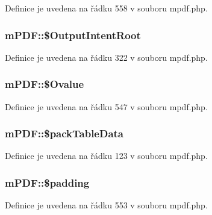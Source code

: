 Definice je uvedena na řádku 558 v souboru mpdf.\-php.

\hypertarget{classm_p_d_f_aa107caae1812606296893657965b6307}{
\subsubsection[{\$\-Output\-Intent\-Root}]{\setlength{\rightskip}{0pt plus 5cm}m\-P\-D\-F\-::\$\-Output\-Intent\-Root}}\label{classm_p_d_f_aa107caae1812606296893657965b6307}


Definice je uvedena na řádku 322 v souboru mpdf.\-php.

\hypertarget{classm_p_d_f_aef5bb0c65068a9cc33325ce6deb98f33}{
\subsubsection[{\$\-Ovalue}]{\setlength{\rightskip}{0pt plus 5cm}m\-P\-D\-F\-::\$\-Ovalue}}\label{classm_p_d_f_aef5bb0c65068a9cc33325ce6deb98f33}


Definice je uvedena na řádku 547 v souboru mpdf.\-php.

\hypertarget{classm_p_d_f_a4dfe7716d0f498ac516939b9abcf52ae}{
\subsubsection[{\$pack\-Table\-Data}]{\setlength{\rightskip}{0pt plus 5cm}m\-P\-D\-F\-::\$pack\-Table\-Data}}\label{classm_p_d_f_a4dfe7716d0f498ac516939b9abcf52ae}


Definice je uvedena na řádku 123 v souboru mpdf.\-php.

\hypertarget{classm_p_d_f_a25bc595e56572f72017112f5e3d39530}{
\subsubsection[{\$padding}]{\setlength{\rightskip}{0pt plus 5cm}m\-P\-D\-F\-::\$padding}}\label{classm_p_d_f_a25bc595e56572f72017112f5e3d39530}


Definice je uvedena na řádku 553 v souboru mpdf.\-php.

